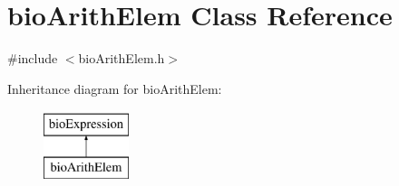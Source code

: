 \hypertarget{classbio_arith_elem}{}\section{bio\+Arith\+Elem Class Reference}
\label{classbio_arith_elem}


{\ttfamily \#include $<$bio\+Arith\+Elem.\+h$>$}

Inheritance diagram for bio\+Arith\+Elem\+:\begin{figure}[H]
\begin{center}
\leavevmode
\includegraphics[height=2.000000cm]{classbio_arith_elem}
\end{center}
\end{figure}

